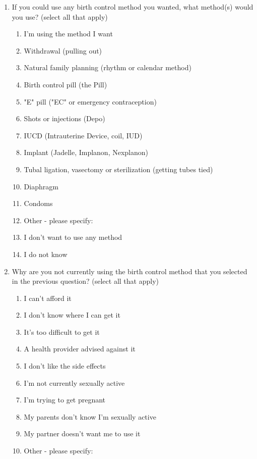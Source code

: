 \begin{enumerate}
\begin{enumerate}
        \item If you could use any birth control method you wanted, what method(s) would you use? (select all that apply)
            \begin{enumerate}
                \item I'm using the method I want
                \item Withdrawal (pulling out)
                \item Natural family planning (rhythm or calendar method)
                \item Birth control pill (the Pill)
                \item "E" pill ("EC" or emergency contraception)
                \item Shots or injections (Depo)
                \item IUCD (Intrauterine Device, coil, IUD)
                \item Implant (Jadelle, Implanon, Nexplanon)
                \item Tubal ligation, vasectomy or sterilization (getting tubes tied)
                \item Diaphragm
                \item Condoms
                \item Other - please specify:
                \item I don't want to use any method
                \item I do not know
            \end{enumerate} 
        \item Why are you not currently using the birth control method that you selected in the previous question? (select all that apply)
        \begin{enumerate}
            \item I can't afford it
            \item I don't know where I can get it
            \item It's too difficult to get it
            \item A health provider advised against it
            \item I don't like the side effects
            \item I'm not currently sexually active
            \item I'm trying to get pregnant
            \item My parents don't know I'm sexually active
            \item My partner doesn't want me to use it
            \item Other - please specify:
        \end{enumerate}
    \end{enumerate}
    
\end{enumerate}

